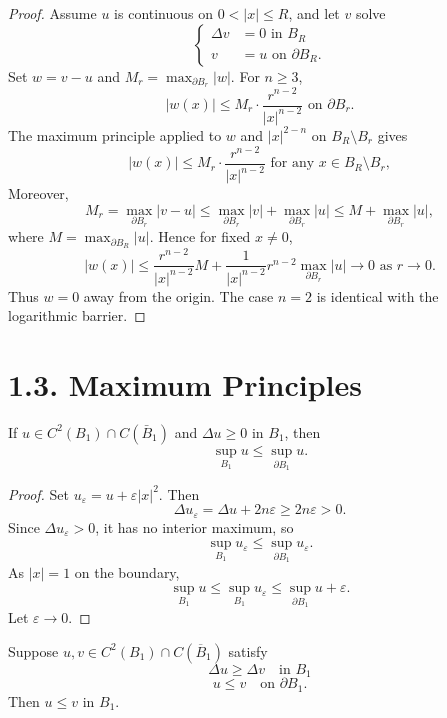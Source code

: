 \begin{proof}
\sketch Assume $u$ is continuous on $0<|x|\le R$, and let $v$ solve
\[
\left\{
\begin{aligned}
\Delta v &= 0 \text{ in } B_R \\
v &= u \text{ on } \partial B_R.
\end{aligned}
\right.
\]
Set $w=v-u$ and $M_r=\max_{\partial B_r}|w|$. For $n\ge3$,
\[
|w(x)| \le M_r \cdot \frac{r^{n-2}}{|x|^{n-2}} \text{ on } \partial B_r.
\]
The maximum principle applied to $w$ and $|x|^{2-n}$ on
$B_R\setminus B_r$ gives
\[
|w(x)| \le M_r \cdot \frac{r^{n-2}}{|x|^{n-2}} \text{ for any } x \in B_R \setminus B_r,
\]
Moreover,
\[
M_r = \max_{\partial B_r} |v - u| \le \max_{\partial B_r} |v| + \max_{\partial B_r} |u| \le M + \max_{\partial B_r} |u|,
\]
where $M=\max_{\partial B_R}|u|$. Hence for fixed $x\ne0$,
\[
|w(x)| \le \frac{r^{n-2}}{|x|^{n-2}} M + \frac{1}{|x|^{n-2}} r^{n-2} \max_{\partial B_r} |u| \to 0 \text{ as } r \to 0.
\]
Thus $w=0$ away from the origin. The case $n=2$ is identical with the logarithmic
barrier.
\end{proof}

\section*{1.3. Maximum Principles}

\begin{theorem}\label{hanlin:thm-subharmonic-max}
If $u \in C^2(B_1)\cap C(\bar B_1)$ and $\Delta u\ge0$ in $B_1$, then
\[
\sup_{B_1} u \le \sup_{\partial B_1} u.
\]
\end{theorem}

\begin{proof}
\sketch Set $u_\varepsilon=u+\varepsilon|x|^2$. Then
\[
\Delta u_\varepsilon = \Delta u + 2n \varepsilon \ge 2n \varepsilon > 0.
\]
Since $\Delta u_\varepsilon>0$, it has no interior maximum, so
\[
\sup_{B_1} u_\varepsilon \le \sup_{\partial B_1} u_\varepsilon.
\]
As $|x|=1$ on the boundary,
\[
\sup_{B_1} u \le \sup_{B_1} u_\varepsilon \le \sup_{\partial B_1} u + \varepsilon.
\]
Let $\varepsilon\to0$.
\end{proof}

\begin{corollary}\label{hanlin:corollary-comparison-principle}
Suppose $u,v \in C^2(B_1)\cap C(\overline{B}_1)$ satisfy
\[
\Delta u \ge \Delta v \quad \text{in } B_1
\]
\[
u \le v \quad \text{on } \partial B_1.
\]
Then $u \le v$ in $B_1$.
\end{corollary}

